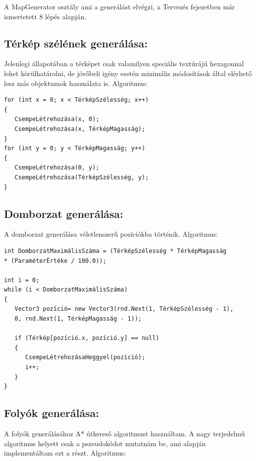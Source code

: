 \noindent A MapGenerator osztály ami a generálást elvégzi, a Tervezés fejezetben már ismertetett 8 lépés alapján.

\subsection{Térkép szélének generálása:}

Jelenlegi állapotában a térképet csak valamilyen speciális textúrájú hexagonnal lehet körülhatárolni, de jövőbeli igény esetén minimális módosítások által elérhető lesz más objektumok használata is. 
\newline
\newline Algoritmus:

\begin{verbatim}
for (int x = 0; x < TérképSzélesség; x++)
{
   CsempeLétrehozása(x, 0);
   CsempeLétrehozása(x, TérképMagasság);
}
for (int y = 0; y < TérképMagasság; y++)
{
   CsempeLétrehozása(0, y);
   CsempeLétrehozása(TérképSzélesség, y);
}
\end{verbatim}

\subsection{Domborzat generálása:}

A domborzat generálása véletlenszerű pozíciókba történik.
\newline
\newline Algoritmus:

\begin{verbatim}
int DomborzatMaximálisSzáma = (TérképSzélesség * TérképMagasság
* (ParaméterÉrtéke / 100.0));

int i = 0;
while (i < DomborzatMaximálisSzáma)
{
   Vector3 pozíció= new Vector3(rnd.Next(1, TérképSzélesség - 1),
   0, rnd.Next(1, TérképMagasság - 1));

   if (Térkép[pozíció.x, pozíció.y] == null)
   {
      CsempeLétrehozásaHeggyel(pozíció);
      i++;
   }
}
\end{verbatim}

\subsection{Folyók generálása:}

A folyók generálásához A* útkereső algoritmust használtam. A nagy terjedelmű algoritmus helyett csak a pszeudokódot mutatnám be, ami alapján implementáltam ezt a részt.
\newline
\newline Algoritmus:

